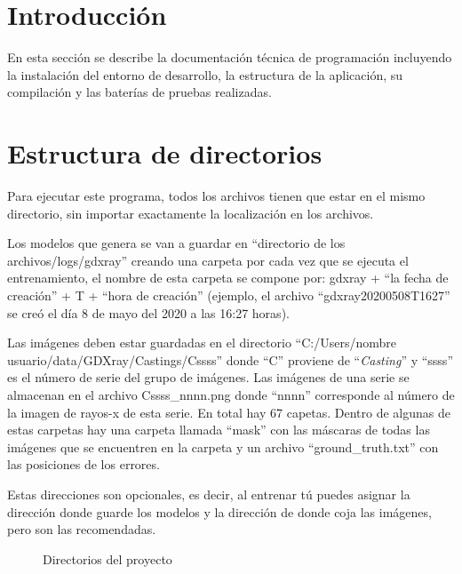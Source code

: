 
\section{Introducción}

En esta sección se describe la documentación técnica de programación incluyendo la instalación del entorno de desarrollo, la estructura de la aplicación, su compilación y las baterías de pruebas realizadas.

\section{Estructura de directorios}

Para ejecutar este programa, todos los archivos tienen que estar en el mismo directorio, sin importar exactamente la localización en los archivos.

Los modelos que genera se van a guardar en ``directorio de los archivos/logs/gdxray'' creando una carpeta por cada vez que se ejecuta el entrenamiento, el nombre de esta carpeta se compone por: gdxray + ``la fecha de creación'' + T + ``hora de creación'' (ejemplo, el archivo ``gdxray20200508T1627'' se creó el día 8 de mayo del 2020 a las 16:27 horas).

Las imágenes deben estar guardadas en el directorio ``C:/Users/nombre usuario/data/GDXray/Castings/Cssss'' donde ``C'' proviene de ``\textit{Casting}'' y ``ssss'' es el número de serie del grupo de imágenes. Las imágenes de una serie se almacenan en el archivo Cssss\_nnnn.png donde ``nnnn'' corresponde al número de la imagen de rayos-x de esta serie. En total hay 67 capetas. Dentro de algunas de estas carpetas hay una carpeta llamada ``mask'' con las máscaras de todas las imágenes que se encuentren en la carpeta y un archivo ``ground\_truth.txt'' con las posiciones de los errores.

Estas direcciones son opcionales, es decir, al entrenar tú puedes asignar la dirección donde guarde los modelos y la dirección de donde coja las imágenes, pero son las recomendadas.

\begin{figure}[h]
	\caption{Directorios del proyecto}
	\label{directoriosdelproyecto}
\end{figure}

